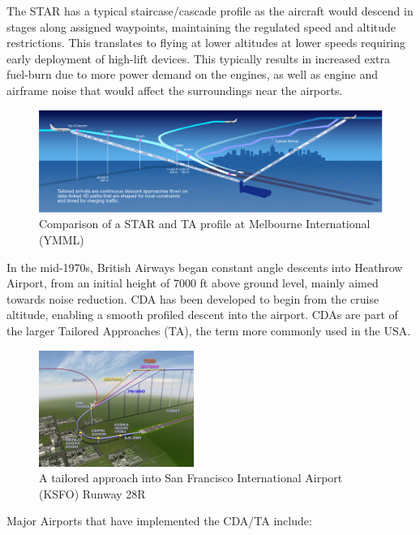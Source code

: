 \documentclass{aer1315-pretty}
\begin{document}
The STAR has a typical staircase/cascade profile as the aircraft would descend in stages along assigned waypoints, maintaining the regulated speed and altitude restrictions. This translates to flying at lower altitudes at lower speeds requiring early deployment of high-lift devices. This typically results in increased extra fuel-burn due to more power demand on the engines, as well as engine and airframe noise that would affect the surroundings near the airports.\par
\vspace{-0.8mm}
\begin{figure}[!h]
\centering
\includegraphics[width=1\textwidth]{figures/Tailored_Arrivals_YMML.jpg}
	\caption{Comparison of a STAR and TA profile at Melbourne International (YMML)}	
	\label{fig:Compare}
\end{figure}
\vspace{-0.8mm}
In the mid-1970s, British Airways began constant angle descents into Heathrow Airport, from an initial height of 7000 ft above ground level, mainly aimed towards noise reduction. CDA has been developed to begin from the cruise altitude, enabling a smooth profiled descent into the airport. CDAs are part of the larger Tailored Approaches (TA), the term more commonly used in the USA.\par
\begin{figure}
\centering
\includegraphics[width=0.45\textwidth]{figures/ils28R_tailored.jpg}
	\caption{A tailored approach into San Francisco International Airport (KSFO) Runway 28R}	
	\label{fig:KSFO ILS 28R}
\end{figure}
Major Airports that have implemented the CDA/TA include:
\vspace{-2.4mm}
\end{document}
